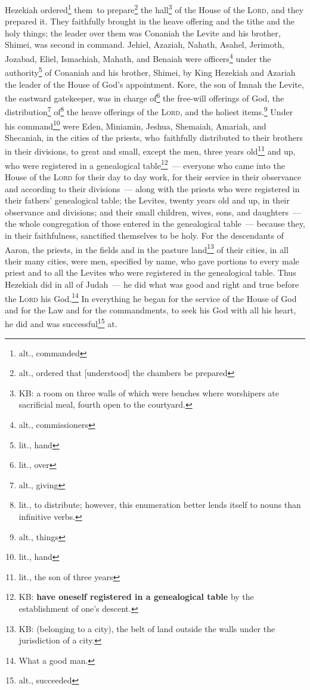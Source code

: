 \begin{inparaenum}
     Hezekiah ordered\footnote{alt., commanded} them\understood\ to prepare\footnote{alt., ordered that [understood] the chambers be prepared} the hall\footnote{KB: a room on three walls of which were benches where worshipers ate sacrificial meal, fourth open to the courtyard.} of the House of the \textsc{Lord}, and they prepared it.\understood%
     They faithfully brought in the heave offering and the tithe and the holy things; the leader over them was Conaniah the Levite and his brother, Shimei, was second in command.\understood%
     Jehiel, Azaziah, Nahath, Asahel, Jerimoth, Jozabad, Eliel, Ismachiah, Mahath, and Benaiah were officers\footnote{alt., commissioners} under the authority\footnote{lit., hand} of Conaniah and his brother, Shimei, by King Hezekiah and Azariah the leader of the House of God's appointment.%
     Kore, the son of Imnah the Levite, the eastward gatekeeper, was in charge of\footnote{lit., over} the free-will offerings of God, the distribution\footnote{alt., giving} of\footnote{lit., to distribute; however, this enumeration better lends itself to nouns than infinitive verbs.} the heave offerings of the \textsc{Lord}, and the holiest items.\footnote{alt., things}%
     Under his command\footnote{lit., hand} were Eden, Miniamin, Jeshua, Shemaiah, Amariah, and Shecaniah, in the cities of the priests, who\understood\ faithfully distributed to their brothers in their divisions, to great and small,%
     except the men, three years old\footnote{lit., the son of three years} and up, who were registered in a genealogical table\footnote{KB: \textbf{have oneself registered in a genealogical table} by the establishment of one's descent.}~--- everyone who came into the House of the \textsc{Lord} for their day to day work, for their service in their observance and according to their divisions~---%
     along with the priests who were registered in their fathers' genealogical table; the Levites, twenty years old and up, in their observance and divisions;%
     and their small children, wives, sons, and daughters~--- the whole congregation of those entered in the genealogical table~--- because they, in their faithfulness, sanctified themselves to be holy.%
     For the descendants of Aaron, the priests, in the fields and in the pasture land\footnote{KB: (belonging to a city), the belt of land outside the walls under the jurisdiction of a city.} of their cities, in all their many cities, were men, specified by name, who gave portions to every male priest and to all the Levites who were registered in the genealogical table.%
     Thus Hezekiah did in all of Judah~--- he did what was good and right and true before the \textsc{Lord} his God.\footnote{What a good man.}%
     In everything he began for the service of the House of God and for the Law and for the commandments, to seek his God with all his heart, he did and was successful\footnote{alt., succeeded} at.\understood%
\end{inparaenum}
